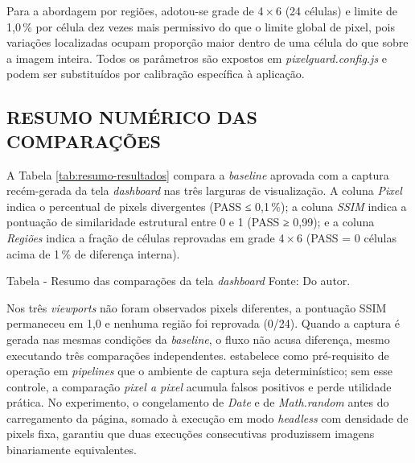 \documentclass{UNESC}
\begin{document}
Para a abordagem por regiões, adotou-se grade de 4\,$\times$\,6 (24 células) e limite de 1,0\,\% por célula dez vezes mais permissivo do que o limite global de pixel, pois variações localizadas ocupam proporção maior dentro de uma célula do que sobre a imagem inteira. Todos os parâmetros são expostos em \emph{pixelguard.config.js} e podem ser substituídos por calibração específica à aplicação.

\subsection{RESUMO NUMÉRICO DAS COMPARAÇÕES}
A Tabela \ref{tab:resumo-resultados} compara a \emph{baseline} aprovada com a captura recém-gerada da tela \textit{dashboard} nas três larguras de visualização. A coluna \emph{Pixel} indica o percentual de pixels divergentes (PASS ≤ 0,1\,\%); a coluna \emph{SSIM} indica a pontuação de similaridade estrutural entre 0 e 1 (PASS ≥ 0,99); e a coluna \emph{Regiões} indica a fração de células reprovadas em grade 4\,$\times$\,6 (PASS = 0 células acima de 1\,\% de diferença interna).

\vspace{0.2cm}
\begin{table}[H]
\centering
\captionlistentry{}
Tabela \thetable  \hspace{0.5pt} - {Resumo das comparações da tela \textit{dashboard}}
\label{tab:resumo-resultados}
\vspace{-0.3cm}
\flushleft
\hspace{0cm}\footnotesize Fonte: Do autor.
\end{table}

Nos três \emph{viewports} não foram observados pixels diferentes, a pontuação SSIM permaneceu em 1,0 e nenhuma região foi reprovada (0/24). Quando a captura é gerada nas mesmas condições da \emph{baseline}, o fluxo não acusa diferença, mesmo executando três comparações independentes.  estabelece como pré-requisito de operação em \emph{pipelines} que o ambiente de captura seja determinístico; sem esse controle, a comparação \emph{pixel a pixel} acumula falsos positivos e perde utilidade prática. No experimento, o congelamento de \emph{Date} e de \emph{Math.random} antes do carregamento da página, somado à execução em modo \emph{headless} com densidade de pixels fixa, garantiu que duas execuções consecutivas produzissem imagens binariamente equivalentes.
\end{document}
